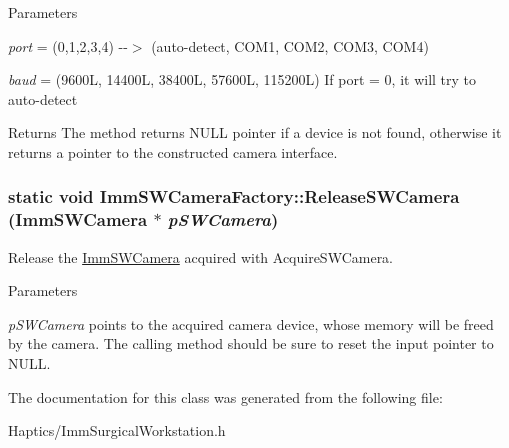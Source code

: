 \begin{DoxyParams}{Parameters}
\item[{\em port}]= (0,1,2,3,4) -\/-\/$>$ (auto-\/detect, COM1, COM2, COM3, COM4)\item[{\em baud}]= (9600L, 14400L, 38400L, 57600L, 115200L) If port = 0, it will try to auto-\/detect\end{DoxyParams}
\begin{DoxyReturn}{Returns}
The method returns NULL pointer if a device is not found, otherwise it returns a pointer to the constructed camera interface. 
\end{DoxyReturn}
\hypertarget{classImmSWCameraFactory_ae79071dfb76070b97d7c2c38263480ae}{
\subsubsection[{ReleaseSWCamera}]{\setlength{\rightskip}{0pt plus 5cm}static void ImmSWCameraFactory::ReleaseSWCamera ({\bf ImmSWCamera} $\ast$ {\em pSWCamera})}}
\label{classImmSWCameraFactory_ae79071dfb76070b97d7c2c38263480ae}
Release the \hyperlink{classImmSWCamera}{ImmSWCamera} acquired with AcquireSWCamera.


\begin{DoxyParams}{Parameters}
\item[{\em pSWCamera}]points to the acquired camera device, whose memory will be freed by the camera. The calling method should be sure to reset the input pointer to NULL. \end{DoxyParams}


The documentation for this class was generated from the following file:\begin{DoxyCompactItemize}
\item 
Haptics/ImmSurgicalWorkstation.h\end{DoxyCompactItemize}
